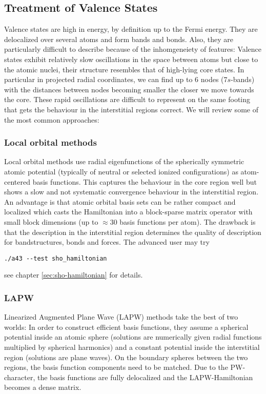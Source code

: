 \documentclass[oribibl]{llncs}
\begin{document}
\subsection{Treatment of Valence States} \label{sec:valence-states}
%
Valence states are high in energy, by definition up to the Fermi energy.
They are delocalized over several atoms and form bands and bonds.
Also, they are particularly difficult to describe because of the 
inhomgeneiety of features:
Valence states exhibit relatively slow oscillations 
in the space between atoms but close to the atomic nuclei,
their structure resembles that of high-lying core states.
In particular in projected radial coordinates, we can find up to $6$ nodes
(7$s$-bands) with the distances between nodes becoming smaller
the closer we move towards the core.
These rapid oscillations are difficult to represent
on the same footing that gets the behaviour in the interstitial regions correct. 
We will review some of the most common approaches:

\subsubsection*{Local orbital methods}
Local orbital methods use radial eigenfunctions 
of the spherically symmetric atomic potential (typically of neutral or selected ionized configurations) as atom-centered basis functions.
This captures the behaviour in the core region well
but shows a slow and not systematic convergence behaviour in the interstitial region. 
An advantage is that atomic orbital basis sets can be rather compact
and localized which casts the Hamiltonian into a block-sparse matrix operator with small block dimensions (up to $\approx 30$ basis functions per atom).
The drawback is that the description in the interstitial region determines the
quality of description for bandstructures, bonds and forces.
The advanced user may try
\begin{verbatim}
./a43 --test sho_hamiltonian
\end{verbatim}
see chapter \ref{sec:sho-hamiltonian} for details.

\subsubsection*{LAPW}
Linearized Augmented Plane Wave (LAPW) methods take the best of two worlds:
In order to construct efficient basis functions, 
they assume a spherical potential inside an atomic sphere (solutions are numerically given radial functions multiplied by spherical harmonics)
and a constant potential inside the interstitial region (solutions are plane waves). 
On the boundary spheres between the two regions, the basis function components need to be matched.
Due to the \ac{PW}-character, the basis functions are fully delocalized and 
the LAPW-Hamiltonian becomes a dense matrix.
\end{document}
